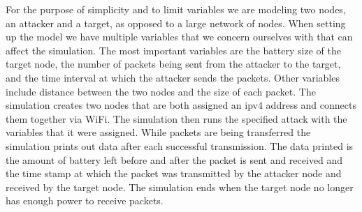 For the purpose of simplicity and to limit variables we are modeling two nodes, an attacker and a target, as opposed to a large network of nodes. When setting up the model we have multiple variables that we concern ourselves with that can affect the simulation. The most important variables are the battery size of the target node, the number of packets being sent from the attacker to the target, and the time interval at which the attacker sends the packets. Other variables include distance between the two nodes and the size of each packet. The simulation creates two nodes that are both assigned an ipv4 address and connects them together via WiFi. The simulation then runs the specified attack with the variables that it were assigned. While packets are being transferred the simulation prints out data after each successful transmission. The data printed is the amount of battery left before and after the packet is sent and received and the time stamp at which the packet was transmitted by the attacker node and received by the target node. The simulation ends when the target node no longer has enough power to receive packets.
